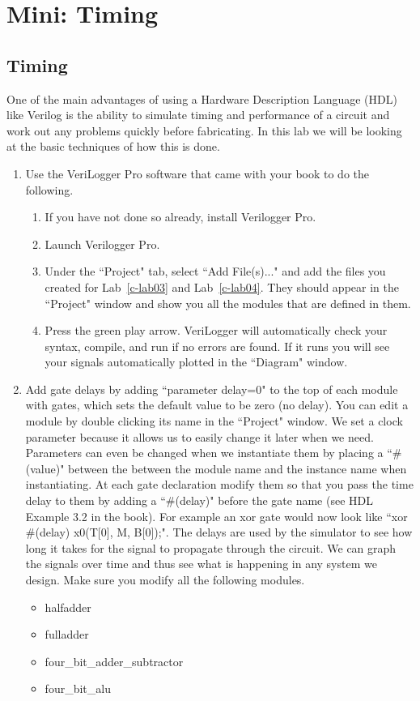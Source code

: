 \chapter{Mini: Timing}
\label{c-lab-time}

\section{Timing}

One of the main advantages of using a Hardware Description Language (HDL) like Verilog is the ability to simulate timing and performance of a circuit and work out any problems quickly before fabricating.  In this lab we will be looking at the basic techniques of how this is done.

\begin{enumerate}

\item Use the VeriLogger Pro software that came with your book to do the following.
      \begin{enumerate}
      \item If you have not done so already, install Verilogger Pro.
      \item Launch Verilogger Pro.
      \item Under the ``Project" tab, select ``Add File(s)..." and add the files you created for Lab~\ref{c-lab03} and Lab~\ref{c-lab04}.  They should appear in the ``Project" window and show you all the modules that are defined in them.
      \item Press the green play arrow.  VeriLogger will automatically check your syntax, compile, and run if no errors are found.  If it runs you will see your signals automatically plotted in the ``Diagram" window.
      \end{enumerate}

\item Add gate delays by adding ``parameter delay=0" to the top of each module with gates, which sets the default value to be zero (no delay).  You can edit a module by double clicking its name in the ``Project" window.  We set a clock parameter because it allows us to easily change it later when we need.  Parameters can even be changed when we instantiate them by placing a ``\#(value)" between the between the module name and the instance name when instantiating.  At each gate declaration modify them so that you pass the time delay to them by adding a ``\#(delay)" before the gate name (see HDL Example 3.2 in the book).  For example an xor gate would now look like ``xor \#(delay) x0(T[0], M, B[0]);".  The delays are used by the simulator to see how long it takes for the signal to propagate through the circuit.  We can graph the signals over time and thus see what is happening in any system we design.  Make sure you modify all the following modules.
      \begin{itemize}
      \item halfadder
      \item fulladder
      \item four\_bit\_adder\_subtractor
      \item four\_bit\_alu
      \end{itemize}


\end{enumerate}
